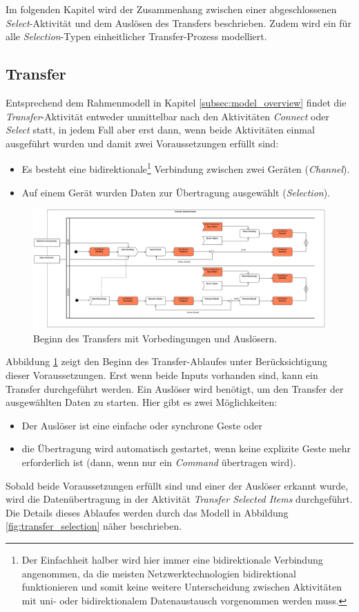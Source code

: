 Im folgenden Kapitel wird der Zusammenhang zwischen einer abgeschlossenen \textit{Select}-Aktivität und dem Auslösen des Transfers beschrieben. Zudem wird ein für alle \textit{Selection}-Typen einheitlicher Transfer-Prozess modelliert.

\subsection{Transfer}
\label{subsec:transfer}
Entsprechend dem Rahmenmodell in Kapitel \ref{subsec:model_overview} findet die  \textit{Transfer}-Aktivität entweder unmittelbar nach den Aktivitäten \textit{Connect} oder \textit{Select} statt, in jedem Fall aber erst dann, wenn beide Aktivitäten einmal ausgeführt wurden und damit zwei Voraussetzungen erfüllt sind:
\begin{itemize}
\item Es besteht eine bidirektionale\footnote{Der Einfachheit halber wird hier immer eine bidirektionale Verbindung angenommen, da die meisten Netzwerktechnologien bidirektional funktionieren und somit keine weitere Unterscheidung zwischen Aktivitäten mit uni- oder bidirektionalem Datenaustausch vorgenommen werden muss.} Verbindung zwischen zwei Geräten (\textit{Channel}).
\item Auf einem Gerät wurden Daten zur Übertragung ausgewählt (\textit{Selection}).
\end{itemize}
\begin{figure}[h]
\centering
\includegraphics[page=2,width=1\textwidth]{bilder/transfer.pdf}
\caption{Beginn des Transfers mit Vorbedingungen und Auslösern.}
\label{fig:transfer}
\end{figure}

Abbildung \ref{fig:transfer} zeigt den Beginn des Transfer-Ablaufes unter Berücksichtigung dieser Voraussetzungen. Erst wenn beide Inputs vorhanden sind, kann ein Transfer durchgeführt werden. Ein Auslöser wird benötigt, um den Transfer der ausgewählten Daten zu starten. Hier gibt es zwei Möglichkeiten:
\begin{itemize}
\item Der Auslöser ist eine einfache oder synchrone Geste oder
\item die Übertragung wird automatisch gestartet, wenn keine explizite Geste mehr erforderlich ist (\zb dann, wenn nur ein \textit{Command} übertragen wird).
\end{itemize}
Sobald beide Voraussetzungen erfüllt sind und einer der Auslöser erkannt wurde,  wird die Datenübertragung in der Aktivität \textit{Transfer Selected Items} durchgeführt. Die Details dieses Ablaufes werden durch das Modell in Abbildung \ref{fig:transfer_selection} näher beschrieben. 

